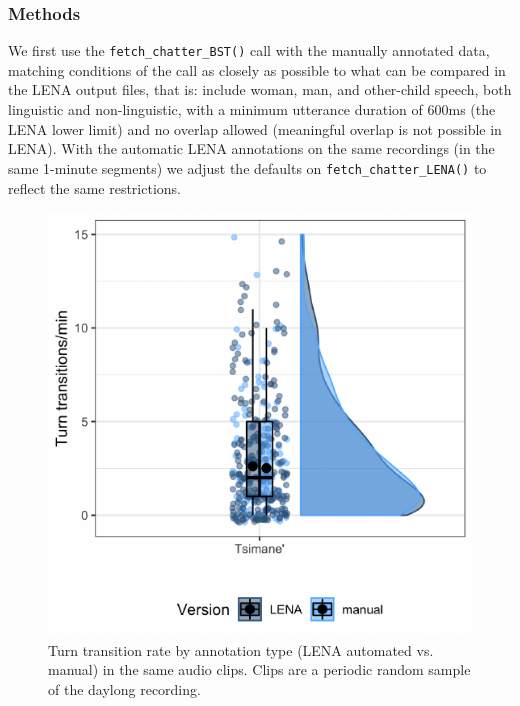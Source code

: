 \documentclass[10pt, letterpaper]{article}
\newenvironment{CodeChunk}{}{}
\begin{document}
\hypertarget{methods-1}{%
\subsubsection{Methods}\label{methods-1}}

We first use the \texttt{fetch\_chatter\_BST()} call with the manually
annotated data, matching conditions of the call as closely as possible
to what can be compared in the LENA output files, that is: include
woman, man, and other-child speech, both linguistic and non-linguistic,
with a minimum utterance duration of 600ms (the LENA lower limit) and no
overlap allowed (meaningful overlap is not possible in LENA). With the
automatic LENA annotations on the same recordings (in the same 1-minute
segments) we adjust the defaults on \texttt{fetch\_chatter\_LENA()} to
reflect the same restrictions.

\begin{CodeChunk}
\begin{figure}[h]

{\centering \includegraphics{figs/tsi.ttr.fig-1} 

}

\caption[Turn transition rate by annotation type (LENA automated vs]{Turn transition rate by annotation type (LENA automated vs. manual) in the same audio clips. Clips are a periodic random sample of the daylong recording.}\label{fig:tsi.ttr.fig}
\end{figure}
\end{CodeChunk}
\end{document}
